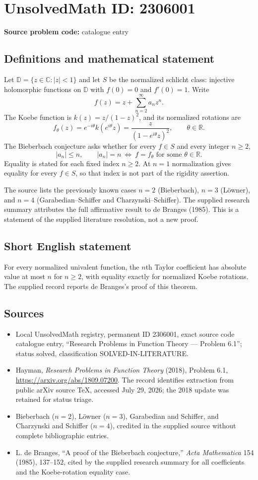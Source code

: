 \documentclass[11pt]{article}
\newcommand{\R}{\mathbb{R}}
\newcommand{\C}{\mathbb{C}}
\begin{document}
\section*{UnsolvedMath ID: 2306001}
\textbf{Source problem code:} catalogue entry
\subsection{Definitions and mathematical statement}
Let $\mathbb D=\{z\in\C:|z|<1\}$ and let $S$ be the normalized schlicht class: injective holomorphic functions on $\mathbb D$ with $f(0)=0$ and $f'(0)=1$. Write
\[
f(z)=z+\sum_{n=2}^\infty a_nz^n.
\]
The Koebe function is $k(z)=z/(1-z)^2$, and its normalized rotations are
\[
f_\theta(z)=e^{-i\theta}k(e^{i\theta}z)
=\frac{z}{(1-e^{i\theta}z)^2},\qquad\theta\in\R.
\]
The Bieberbach conjecture asks whether for every $f\in S$ and every integer $n\geq2$,
\[
|a_n|\leq n,
\qquad |a_n|=n\ \Longleftrightarrow\ 
f=f_\theta\text{ for some }\theta\in\R.
\]
Equality is stated for each fixed index $n\geq2$. At $n=1$ normalization gives equality for every $f\in S$, so that index is not part of the rigidity assertion.

The source lists the previously known cases $n=2$ (Bieberbach), $n=3$ (L\"owner), and $n=4$ (Garabedian--Schiffer and Charzynski--Schiffer). The supplied research summary attributes the full affirmative result to de Branges (1985). This is a statement of the supplied literature resolution, not a new proof.
\subsection{Short English statement}
For every normalized univalent function, the $n$th Taylor coefficient has absolute value at most $n$ for $n\geq2$, with equality exactly for normalized Koebe rotations. The supplied record reports de Branges's proof of this theorem.
\subsection{Sources}
\begin{itemize}
\item Local UnsolvedMath registry, permanent ID 2306001, exact source code catalogue entry, ``Research Problems in Function Theory --- Problem 6.1''; status solved, classification SOLVED-IN-LITERATURE.
\item Hayman, \emph{Research Problems in Function Theory} (2018), Problem 6.1, \url{https://arxiv.org/abs/1809.07200}. The record identifies extraction from public arXiv source TeX, accessed July 29, 2026; the 2018 update was retained for status triage.
\item Bieberbach ($n=2$), L\"owner ($n=3$), Garabedian and Schiffer, and Charzynski and Schiffer ($n=4$), credited in the supplied source without complete bibliographic entries.
\item L. de Branges, ``A proof of the Bieberbach conjecture,'' \emph{Acta Mathematica} 154 (1985), 137--152, cited by the supplied research summary for all coefficients and the Koebe-rotation equality case.
\end{itemize}
\end{document}
